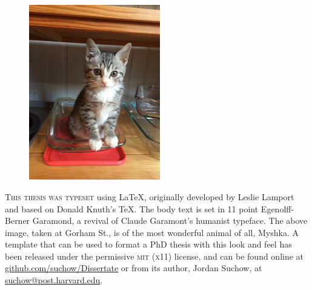 \newpage

\begin{figure}
  \vspace{50pt}
  \centering
    \includegraphics[width=0.51\textwidth]{endmatter/myshka.jpg}
\end{figure}


\begin{center}
\parbox{200pt}{\lettrine[lines=3,slope=-2pt,nindent=-4pt]{\textcolor{SchoolColor}{T}}{his thesis was typeset} using \LaTeX, originally developed by Leslie Lamport and based on Donald Knuth's \TeX. The body text is set in 11 point Egenolff-Berner Garamond, a revival of Claude Garamont's humanist typeface. The above image, taken at Gorham St., is of the most wonderful animal of all, Myshka. A template that can be used to format a PhD thesis with this look and feel has been released under the permissive \textsc{mit} (\textsc{x}11) license, and can be found online at \href{https://github.com/suchow/Dissertate}{github.com/suchow/Dissertate} or from its author, Jordan Suchow, at \href{mailto:suchow@post.harvard.edu}{suchow@post.harvard.edu}.}
\end{center}